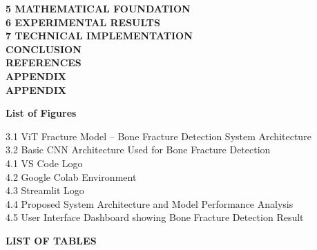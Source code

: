 \documentclass[a4paper,12pt]{report}
\begin{document}
    \textbf{5 MATHEMATICAL FOUNDATION}  \\[3pt]
    
    \textbf{6 EXPERIMENTAL RESULTS}  \\[3pt]

    \textbf{7 TECHNICAL IMPLEMENTATION}  \\[3pt]

    \textbf{CONCLUSION} \\[3pt]
    \textbf{REFERENCES} \\[3pt]
    \textbf{APPENDIX} \\[3pt]

    \textbf{APPENDIX} \\[3pt]

    \newpage
    \begin{center}
    \textbf{\Large List of Figures}
    \end{center}

    \vspace{0.5cm}

    3.1 \hspace{5pt} ViT Fracture Model -- Bone Fracture Detection System Architecture  \\
    3.2 \hspace{5pt} Basic CNN Architecture Used for Bone Fracture Detection  \\
    4.1 \hspace{5pt} VS Code Logo  \\
    4.2 \hspace{5pt} Google Colab Environment  \\
    4.3 \hspace{5pt} Streamlit Logo  \\
    4.4 \hspace{5pt} Proposed System Architecture and Model Performance Analysis  \\
    4.5 \hspace{5pt} User Interface Dashboard showing Bone Fracture Detection Result  \\

    \newpage



    \begin{center}
    \textbf{\Large LIST OF TABLES}
    \end{center}
\end{document}
